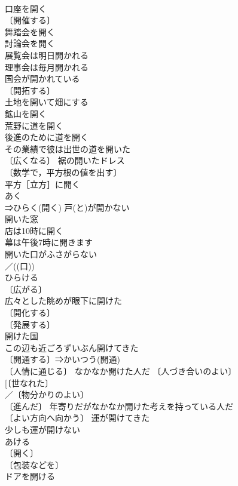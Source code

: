 \documentclass[8pt]{extreport}
\begin{document}
\begin{CJK}{UTF8}{min}
\\	口座を開く 
\\	〔開催する〕
\\	舞踏会を開く 
\\	討論会を開く 
\\	展覧会は明日開かれる 
\\	理事会は毎月開かれる 
\\	国会が開かれている 
\\	〔開拓する〕
\\	土地を開いて畑にする 
\\	鉱山を開く 
\\	荒野に道を開く 
\\	後進のために道を開く 
\\	その業績で彼は出世の道を開いた 
\\	〔広くなる〕 裾の開いたドレス 
\\	〔数学で，平方根の値を出す〕
\\	平方［立方］に開く 
\\	あく　
\\	⇒ひらく(開く) 戸(と)が開かない 
\\	開いた窓 
\\	店は10時に開く 
\\	幕は午後7時に開きます 
\\	開いた口がふさがらない 
\\	／((口)) 
\\	ひらける 
\\	〔広がる〕
\\	広々とした眺めが眼下に開けた 
\\	〔開化する〕
\\	〔発展する〕
\\	開けた国 
\\	この辺も近ごろずいぶん開けてきた 
\\	〔開通する〕⇒かいつう(開通) 
\\	〔人情に通じる〕 なかなか開けた人だ 〔人づき合いのよい〕
\\	[〔世なれた〕
\\	／〔物分かりのよい〕
\\	〔進んだ〕 年寄りだがなかなか開けた考えを持っている人だ 
\\	〔よい方向へ向かう〕 運が開けてきた 
\\	少しも運が開けない 
\\	あける　
\\	〔開く〕
\\	〔包装などを〕
\\	ドアを開ける 

\end{CJK}
\end{document}
